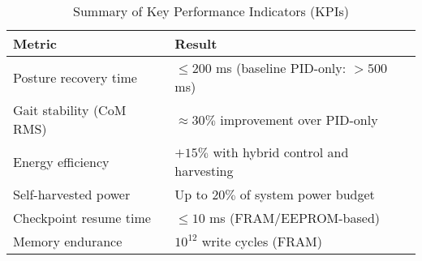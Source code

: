 \begin{table}[t]
\caption{Summary of Key Performance Indicators (KPIs)}
\label{tab:kpi_summary}
\centering
\renewcommand{\arraystretch}{1.15}
\footnotesize
\begin{tabular}{@{}p{} p{}@{}}
\toprule
\textbf{Metric} & \textbf{Result} \\
\midrule
Posture recovery time & $\leq 200$ ms (baseline PID-only: $>500$ ms) \\
Gait stability (CoM RMS) & $\approx 30\%$ improvement over PID-only \\
Energy efficiency & $+15\%$ with hybrid control and harvesting \\
Self-harvested power & Up to $20\%$ of system power budget \\
Checkpoint resume time & $\leq 10$ ms (FRAM/EEPROM-based) \\
Memory endurance & $10^{12}$ write cycles (FRAM) \\
\bottomrule
\end{tabular}
\end{table}
